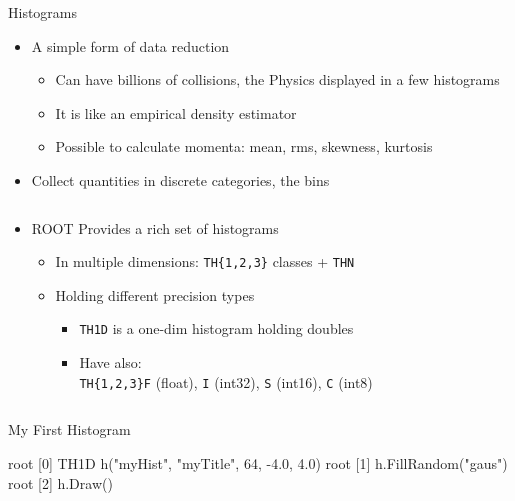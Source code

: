 \documentclass[aspectratio=169]{beamer}
\newcommand{\myfigure}[2]{
    \begin{figure}
        \makebox[\textwidth]{%
            \texttt{[image: \#2]}
        }
    \end{figure}
}
\begin{document}
\begin{frame}[fragile]{Histograms}

\begin{itemize}
    \item{A simple form of data reduction}
    \begin{itemize}
        \item{Can have billions of collisions, the Physics displayed in a few histograms}
        \item{It is like an empirical density estimator}
        \item{Possible to calculate momenta: mean, rms, skewness, kurtosis}
    \end{itemize}
    \item{Collect quantities in discrete categories, the bins}
\end{itemize}

\begin{columns}
    \begin{column}{0.7\textwidth}

\begin{itemize}
    \item{ROOT Provides a rich set of histograms}
    \begin{itemize}
        \item{In multiple dimensions: \texttt{TH\{1,2,3\}} classes + \texttt{THN}}
        \item{Holding different precision types}
        \begin{itemize}
            \item{\texttt{TH1D} is a one-dim histogram holding doubles}
            \item{Have also:\\ \texttt{TH\{1,2,3\}F} (ﬂoat), \texttt{I} (int32), \texttt{S} (int16), \texttt{C} (int8)}
        \end{itemize}
    \end{itemize}
\end{itemize}

\end{column}

    \begin{column}{0.3\textwidth}
        \myfigure{1.00}{CMS-HIG-12-028_Figure_003.pdf}
    \end{column}
\end{columns}

\end{frame}

\begin{frame}[fragile]{My First Histogram}

    \vspace{4mm}

    \begin{myterminal}
root [0] TH1D h("myHist", "myTitle", 64, -4.0, 4.0)
root [1] h.FillRandom("gaus")
root [2] h.Draw()
    \end{myterminal}

    \myfigure{0.6}{figure-001.pdf}

\end{frame}
\end{document}
